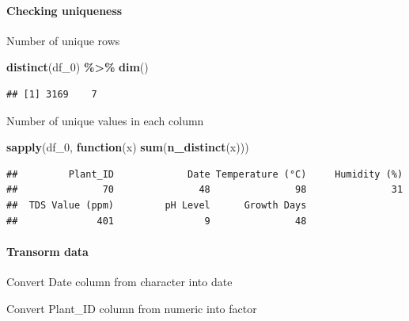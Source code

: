 \documentclass[
]{article}
\newenvironment{Shaded}{\begin{snugshade}}{\end{snugshade}}
\newcommand{\ControlFlowTok}[1]{\textcolor[rgb]{0.13,0.29,0.53}{\textbf{#1}}}
\newcommand{\FunctionTok}[1]{\textcolor[rgb]{0.13,0.29,0.53}{\textbf{#1}}}
\newcommand{\NormalTok}[1]{#1}
\newcommand{\OtherTok}[1]{\textcolor[rgb]{0.56,0.35,0.01}{#1}}
\newcommand{\SpecialCharTok}[1]{\textcolor[rgb]{0.81,0.36,0.00}{\textbf{#1}}}
\begin{document}
\paragraph{Checking uniqueness}\label{checking-uniqueness}

Number of unique rows

\begin{Shaded}
\begin{Highlighting}[]
\FunctionTok{distinct}\NormalTok{(df\_0) }\SpecialCharTok{\%\textgreater{}\%} \FunctionTok{dim}\NormalTok{()}
\end{Highlighting}
\end{Shaded}

\begin{verbatim}
## [1] 3169    7
\end{verbatim}

Number of unique values in each column

\begin{Shaded}
\begin{Highlighting}[]
\FunctionTok{sapply}\NormalTok{(df\_0, }\ControlFlowTok{function}\NormalTok{(x) }\FunctionTok{sum}\NormalTok{(}\FunctionTok{n\_distinct}\NormalTok{(x)))}
\end{Highlighting}
\end{Shaded}

\begin{verbatim}
##         Plant_ID             Date Temperature (°C)     Humidity (%) 
##               70               48               98               31 
##  TDS Value (ppm)         pH Level      Growth Days 
##              401                9               48
\end{verbatim}

\paragraph{Transorm data}\label{transorm-data}

Convert Date column from character into date

\begin{Shaded}
\end{Shaded}

Convert Plant\_ID column from numeric into factor
\end{document}
